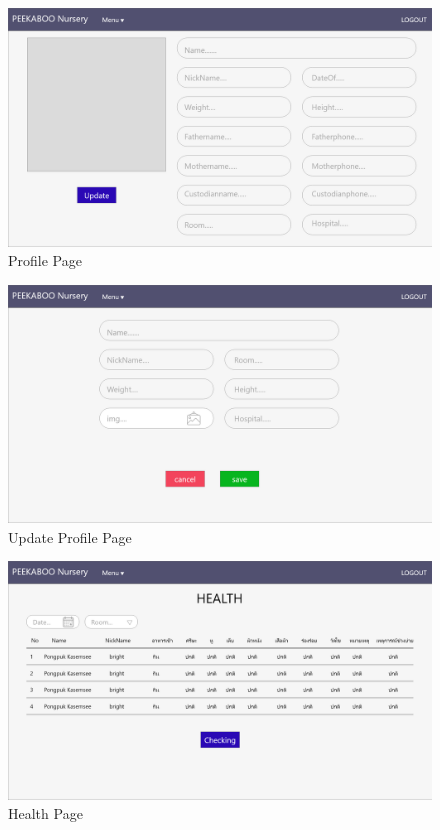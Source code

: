 \begin{figure}
  \begin{center}
  \includegraphics[width=140mm]{images/ProfileTwoPage.png}
  \end{center}
  \caption[Poem]{Profile Page}
  \label{fig:ProfileTwo}
  \end{figure}

\begin{figure}
  \begin{center}
  \includegraphics[width=140mm]{images/updateprofilePage.png}
  \end{center}
  \caption[Poem]{Update Profile Page}
  \label{fig:UpdateProfile}
  \end{figure}

\begin{figure}
  \begin{center}
  \includegraphics[width=140mm]{images/HealthPage.png}
  \end{center}
  \caption[Poem]{Health Page}
  \label{fig:Health}
  \end{figure}

